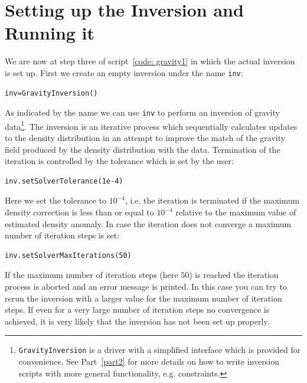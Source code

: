 \section{Setting up the Inversion and Running it}
We are now at step three of script~\ref{code: gravity1} in which the actual
inversion is set up.
First we create an empty inversion under the name \verb|inv|:
\begin{verbatim}
inv=GravityInversion()
\end{verbatim}
As indicated by the name we can use \verb|inv| to perform an inversion of
gravity data\footnote{\verb|GravityInversion| is a driver with a simplified
interface which is provided for convenience. See Part~\ref{part2} for more
details on how to write inversion scripts with more general functionality, e.g.
constraints.}. The inversion is an iterative process which sequentially
calculates updates to the density distribution in an attempt to improve the
match of the gravity field produced by the density distribution with the data.
Termination of the iteration is controlled by the tolerance which is set by
the user:
\begin{verbatim}
inv.setSolverTolerance(1e-4)
\end{verbatim}
Here we set the tolerance to $10^{-4}$, i.e. the iteration is terminated if
the maximum density correction is less than or equal to $10^{-4}$ relative to
the maximum value of estimated density anomaly.
In case the iteration does not converge a maximum number of iteration steps is
set:
\begin{verbatim}
inv.setSolverMaxIterations(50)
\end{verbatim}
If the maximum number of iteration steps (here $50$) is reached the iteration
process is aborted and an error message is printed.
In this case you can try to rerun the inversion with a larger value for the
maximum number of iteration steps.
If even for a very large number of iteration steps no convergence is achieved,
it is very likely that the inversion has not been set up properly.

